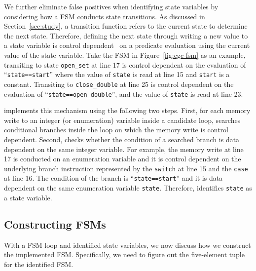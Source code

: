 We further eliminate false positives when identifying state variables 
by considering how a FSM conducts state transitions. 
As discussed in Section~\ref{sec:study}, 
a transition function refers to the current state to determine the next state. 
Therefore, defining the next state through writing a new value to a state variable 
is control dependent~\cite{cdg} on a predicate evaluation 
using the current value of the state variable.  
Take the FSM in Figure~\ref{fig:cgc-fsm} as an example, 
transiting to state \texttt{open\_set} at line 17
is control dependent on the evaluation of ``\texttt{state==start}''
where the value of \texttt{state} is read at line 15 and \texttt{start} is a constant. 
Transiting to \texttt{close\_double} at 
line 25 is control dependent on the 
evaluation of ``\texttt{state==open\_double}'', 
and the value of \texttt{state} is read at line 23.

\Tool{} implements this mechanism using the following two steps. 
First, for each memory write to an integer (or enumeration) 
variable inside a candidate loop, 
\Tool{} searches conditional branches inside the loop 
on which the memory write is control dependent. 
Second, \Tool{} checks whether the condition 
of a searched branch 
is data dependent on the same integer variable. 
For example, the memory write at line 17 is conducted on an enumeration variable
and it is control dependent on the underlying branch 
instruction represented by 
the \texttt{switch} at line 15 and the \texttt{case} at line 16.  
The condition of the branch is ``\texttt{state==start}'' and it is 
data dependent on the same enumeration variable \texttt{state}. 
Therefore, \Tool{} identifies \texttt{state} as a state variable. 



\subsection{Constructing FSMs}
\label{sec:tuple}
With a FSM loop and identified state variables, 
we now discuss how we construct the implemented FSM. 
Specifically, we need to figure out the five-element tuple for the identified FSM. 

